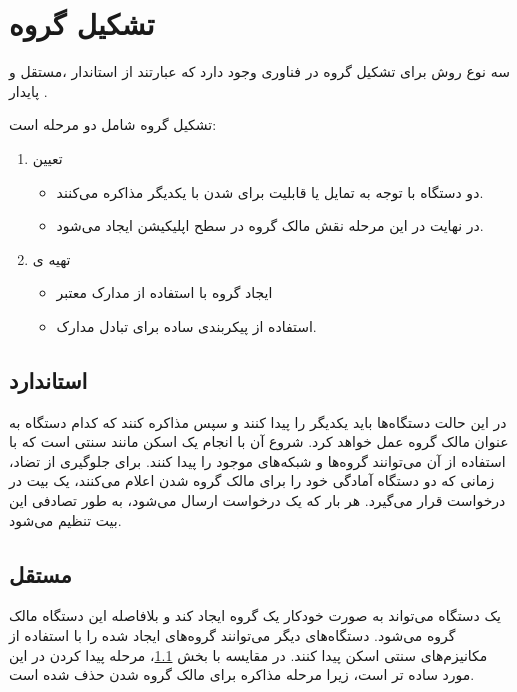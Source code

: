 \section{تشکیل گروه}
سه نوع روش برای تشکیل گروه در فناوری
وجود دارد که عبارتند از استاندار
،مستقل
و پایدار
.

تشکیل گروه شامل دو مرحله است:
\begin{enumerate}
	\item تعیین 
	\begin{itemize}
		\item  دو دستگاه با توجه به تمایل یا قابلیت برای  شدن با یکدیگر مذاکره می‌کنند.
		\item در نهایت در این مرحله نقش مالک گروه در سطح اپلیکیشن ایجاد می‌شود. 
	\end{itemize}
	\item تهیه ی 
	\begin{itemize}
		\item ایجاد  گروه با استفاده از مدارک معتبر
		\item استفاده از پیکربندی ساده  برای تبادل مدارک.
	\end{itemize}
\end{enumerate}

\subsection{استاندارد}\label{subsec:Standard}
در این حالت دستگاه‌ها باید یکدیگر را پیدا 
کنند و سپس مذاکره کنند که کدام دستگاه به عنوان  مالک گروه عمل خواهد کرد. شروع آن با انجام یک اسکن مانند 
 سنتی است که با استفاده از آن می‌توانند گروه‌ها و شبکه‌های
  موجود را پیدا کنند. برای جلوگیری از تضاد، زمانی که دو دستگاه آمادگی خود را برای مالک گروه شدن اعلام می‌کنند، یک بیت 
   در درخواست قرار می‌گیرد. هر بار که یک درخواست ارسال می‌شود، به طور تصادفی این بیت تنظیم می‌شود.
\cite{Camps-Mur}
\subsection{مستقل}
یک دستگاه می‌تواند به صورت خودکار یک گروه  ایجاد کند و بلافاصله این دستگاه مالک گروه می‌شود. دستگاه‌های دیگر می‌توانند گروه‌های ایجاد شده را با استفاده از مکانیزم‌های سنتی اسکن پیدا کنند. در مقایسه با بخش \ref{subsec:Standard}، مرحله پیدا کردن در این مورد ساده تر است، زیرا مرحله مذاکره برای مالک گروه شدن حذف شده است.
\cite{Camps-Mur}
